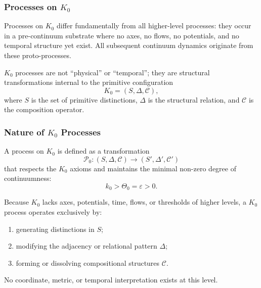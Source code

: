 

\subsubsection{Processes on \texorpdfstring{$K_0$}{K_0}}
\label{sec:processes-k0}

Processes on $K_0$ differ fundamentally from all higher-level processes:
they occur in a pre-continuum substrate where no axes, no flows,
no potentials, and no temporal structure yet exist.
All subsequent continuum dynamics originate from these proto-processes.

$K_0$ processes are not ``physical'' or ``temporal''; they are structural
transformations internal to the primitive configuration
\[
K_0 = (S, \Delta, \mathcal{C}),
\]
where $S$ is the set of primitive distinctions, $\Delta$ is the structural
relation, and $\mathcal{C}$ is the composition operator.

\subsubsection{Nature of \texorpdfstring{$K_0$}{K_0} Processes}

A process on $K_0$ is defined as a transformation
\[
\mathcal{P}_0: (S, \Delta, \mathcal{C}) \longrightarrow (S', \Delta', \mathcal{C}')
\]
that respects the $K_0$ axioms and maintains the minimal non-zero degree of
continuumness:
\[
k_0 > \Theta_0 = \varepsilon > 0.
\]

Because $K_0$ lacks axes, potentials, time, flows, or thresholds of higher
levels, a $K_0$ process operates exclusively by:

\begin{enumerate}
    \item generating distinctions in $S$;
    \item modifying the adjacency or relational pattern $\Delta$;
    \item forming or dissolving compositional structures $\mathcal{C}$.
\end{enumerate}

No coordinate, metric, or temporal interpretation exists at this level.

